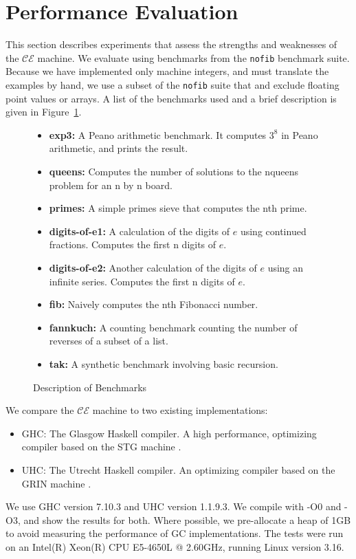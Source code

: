 \section{Performance Evaluation} \label{sec:eval}

This section describes experiments that assess the strengths and weaknesses of
the $\mathcal{CE}$ machine. We evaluate using benchmarks from the \texttt{nofib}
benchmark suite. Because we have implemented only machine integers, and must
translate the examples by hand, we use a subset of the \texttt{nofib} suite that
and exclude floating point values or arrays. A list of the benchmarks used and a
brief description is given in Figure~\ref{fig:bench}.

\begin{figure}
\begin{itemize}
\item \textbf{exp3:} A Peano arithmetic benchmark. It computes $3^8$ in
Peano arithmetic, and prints the result. 
\item \textbf{queens:} Computes the number of solutions to the nqueens problem
for an n by n board.
\item \textbf{primes:} A simple primes sieve that computes the nth prime.
\item \textbf{digits-of-e1:} A calculation of the digits of $e$ using continued
fractions. Computes the first n digits of $e$.
\item \textbf{digits-of-e2:} Another calculation of the digits of $e$ using an
infinite series. Computes the first n digits of $e$. 
\item \textbf{fib:} Naively computes the nth Fibonacci number.
\item \textbf{fannkuch:} A counting benchmark counting the number of reverses of
a subset of a list.
\item \textbf{tak:} A synthetic benchmark involving basic recursion.
\end{itemize}
\caption{Description of Benchmarks}
\label{fig:bench}
\end{figure}

We compare the $\mathcal{CE}$ machine to two existing implementations:

\begin{itemize}
\item GHC: The Glasgow Haskell compiler. A high performance, optimizing compiler
based on the STG machine \cite{jonesstg}.
\item UHC: The Utrecht Haskell compiler. An optimizing compiler based on the
GRIN machine \cite{boquist1997grin,dijkstra2009architecture}.
\end{itemize}

We use GHC version 7.10.3 and UHC version 1.1.9.3. We compile with -O0 and -O3,
and show the results for both. Where possible, we pre-allocate a heap of 1GB 
to avoid measuring the performance of GC implementations. The tests were run on
an Intel(R) Xeon(R) CPU E5-4650L @ 2.60GHz, running Linux version 3.16. 
